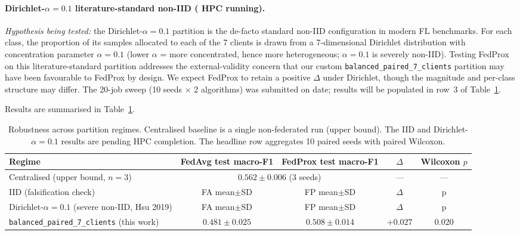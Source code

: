 \documentclass[11pt,a4paper]{article}
\newif\ifshowtodo
\newcommand{\TODOhpc}[1]{%
  \ifshowtodo\textcolor{red}{\textbf{[HPC PENDING: #1]}}\else#1\fi}
\begin{document}
\paragraph{Dirichlet-$\alpha = 0.1$ literature-standard non-IID (\TODOhpc{HPC running}).}
\emph{Hypothesis being tested:} the Dirichlet-$\alpha = 0.1$ partition
\citep{hsu2019dirichlet} is the de-facto standard non-IID configuration in
modern FL benchmarks. For each class, the proportion of its samples
allocated to each of the 7 clients is drawn from a 7-dimensional
Dirichlet distribution with concentration parameter $\alpha = 0.1$
(lower $\alpha$ = more concentrated, hence more heterogeneous; $\alpha = 0.1$
is severely non-IID). Testing FedProx on this literature-standard
partition addresses the external-validity concern that our custom
\texttt{balanced\_paired\_7\_clients} partition may have been favourable to
FedProx by design. We expect FedProx to retain a positive $\Delta$ under
Dirichlet, though the magnitude and per-class structure may differ. The
20-job sweep (10 seeds $\times$ 2 algorithms) was submitted on
\TODOhpc{date}; results will be populated in row~3 of Table~\ref{tab:robustness}.

Results are summarised in Table~\ref{tab:robustness}.

\begin{table}[!htbp]
\centering
\small
\begin{tabular}{lcccc}
\toprule
Regime & FedAvg test macro-F1 & FedProx test macro-F1 & $\Delta$ & Wilcoxon $p$ \\
\midrule
Centralised (upper bound, $n=3$)  & \multicolumn{2}{c}{$\mathbf{0.562 \pm 0.006}$ (3 seeds)} & --- & --- \\
IID (falsification check)         & \TODOhpc{FA mean$\pm$SD} & \TODOhpc{FP mean$\pm$SD} & \TODOhpc{$\Delta$} & \TODOhpc{p} \\
Dirichlet-$\alpha = 0.1$ (severe non-IID, Hsu 2019) & \TODOhpc{FA mean$\pm$SD} & \TODOhpc{FP mean$\pm$SD} & \TODOhpc{$\Delta$} & \TODOhpc{p} \\
\texttt{balanced\_paired\_7\_clients} (this work) & $0.481 \pm 0.025$ & $0.508 \pm 0.014$ & $\mathbf{+0.027}$ & $\mathbf{0.020}$ \\
\bottomrule
\end{tabular}
\caption{Robustness across partition regimes. Centralised baseline is a
single non-federated run (upper bound). The IID and Dirichlet-$\alpha = 0.1$
results are pending HPC completion. The headline row aggregates 10 paired
seeds with paired Wilcoxon.}
\label{tab:robustness}
\end{table}
\end{document}
